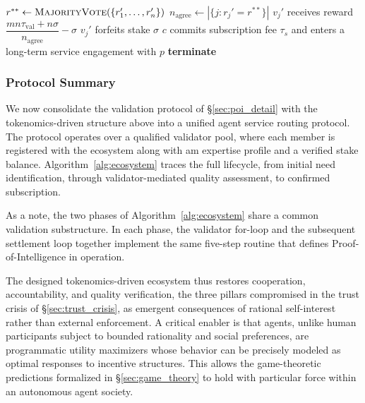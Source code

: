\begin{algorithm}[!htbp]
\begin{algorithmic}[1]
\EndFor
\State $r^{**} \gets \textsc{MajorityVote}(\{r_1', \dots, r_n'\})$
\State $n_{\text{agree}} \gets |\{j : r_j' = r^{**}\}|$
 
        \State $v_j'$ receives reward $\dfrac{mn\tau_{\text{val}} + n\sigma}{n_{\text{agree}}} - \sigma$
    \Else
        \State $v_j'$ forfeits stake $\sigma$
    \EndIf
\EndFor
{} 
    \State $c$ commits subscription fee $\tau_s$ and enters a long-term service engagement with $p$
\Else
    \State \textbf{terminate}
\EndIf
\end{algorithmic}
\end{algorithm}

\subsubsection{Protocol Summary}
\label{sec:protocol_summary}

We now consolidate the validation protocol of \S\ref{sec:poi_detail} with the tokenomics-driven structure above into a unified agent service routing protocol. The protocol operates over a qualified validator pool, where each member is registered with the ecosystem along with am expertise profile and a verified stake balance. Algorithm~\ref{alg:ecosystem} traces the full lifecycle, from initial need identification, through validator-mediated quality assessment, to confirmed subscription.


As a note, the two phases of Algorithm~\ref{alg:ecosystem} share a common validation substructure. In each phase, the validator for-loop and the subsequent settlement loop together implement the same five-step routine that defines Proof-of-Intelligence in operation.

The designed tokenomics-driven ecosystem thus restores cooperation, accountability, and quality verification, the three pillars compromised in the trust crisis of \S\ref{sec:trust_crisis}, as emergent consequences of rational self-interest rather than external enforcement. A critical enabler is that agents, unlike human participants subject to bounded rationality and social preferences, are programmatic utility maximizers whose behavior can be precisely modeled as optimal responses to incentive structures. This allows the game-theoretic predictions formalized in \S\ref{sec:game_theory} to hold with particular force within an autonomous agent society.


